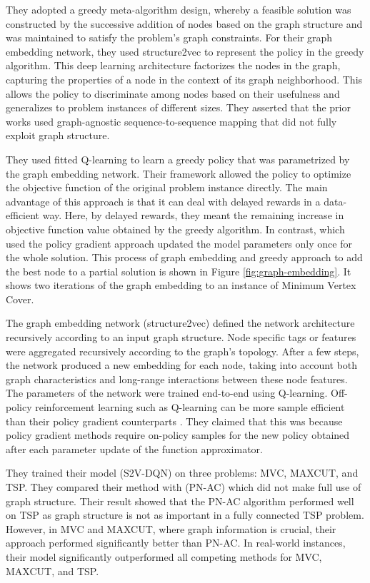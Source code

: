 \documentclass{article}
\begin{document}
They adopted a greedy meta-algorithm design, whereby a feasible solution was constructed by the successive addition of nodes based on the graph structure and was maintained to satisfy the problem's graph constraints. For their graph embedding network, they used structure2vec \cite{dai2016discriminative} to represent the policy in the greedy algorithm. This deep learning architecture factorizes the nodes in the graph, capturing the properties of a node in the context of its graph neighborhood. This allows the policy to discriminate among nodes based on their usefulness and generalizes to problem instances of different sizes. They asserted that the prior works \cite{vinyals2015pointer, bello2016neural} used graph-agnostic sequence-to-sequence \cite{bahdanau2014neural} mapping that did not fully exploit graph structure. 

They used fitted Q-learning to learn a greedy policy that was parametrized by the graph embedding network. Their framework allowed the policy to optimize the objective function of the original problem instance directly. The main advantage of this approach is that it can deal with delayed rewards in a data-efficient way. Here, by delayed rewards, they meant the remaining increase in objective function value obtained by the greedy algorithm. In contrast, \cite{bello2016neural} which used the policy gradient approach updated the model parameters only once for the whole solution. This process of graph embedding and greedy approach to add the best node to a partial solution is shown in Figure \ref{fig:graph-embedding}. It shows two iterations of the graph embedding to an instance of Minimum Vertex Cover. 

The graph embedding network (structure2vec) defined the network architecture recursively according to an input graph structure. Node specific tags or features were aggregated recursively according to the graph's topology. After a few steps, the network produced a new embedding for each node, taking into account both graph characteristics and long-range interactions between these node features. The parameters of the network were trained end-to-end using Q-learning. Off-policy reinforcement learning such as Q-learning can be more sample efficient than their policy gradient counterparts \cite{gu2016q}. They claimed that this was because policy gradient methods require on-policy samples for the new policy obtained after each parameter update of the function approximator.

They trained their model (S2V-DQN) on three problems: MVC, MAXCUT, and TSP. They compared their method with \cite{bello2016neural} (PN-AC) which did not make full use of graph structure. Their result showed that the PN-AC algorithm performed well on TSP as graph structure is not as important in a fully connected TSP problem. However, in MVC and MAXCUT, where graph information is crucial, their approach performed significantly better than PN-AC. In real-world instances, their model significantly outperformed all competing methods for MVC, MAXCUT, and TSP. 
\end{document}

